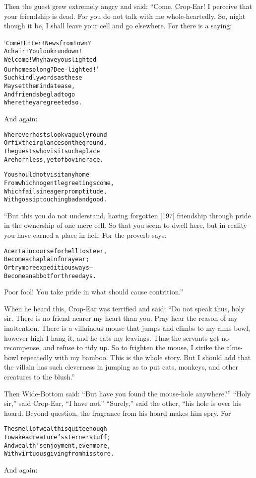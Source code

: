 \documentclass{article}
\renewenvironment{verbatim}{\begin{alltt}\normalfont\begin{centering}}{\end{centering}\end{alltt}}
\begin{document}
Then the guest grew extremely angry and said: “Come, Crop-Ear! I
perceive that your friendship is dead. For you do not talk with me
whole-heartedly. So, night though it be, I shall leave your cell
and go elsewhere. For there is a saying:

\begin{verbatim}
‘Come! Enter! News from town?
A chair! You look run down!
Welcome! Why have you slighted
Our home so long? Dee-lighted!’
Such kindly words as these
May set the mind at ease,
And friends be glad to go
Where they are greeted so.
\end{verbatim}
And again:

\begin{verbatim}
Wherever hosts look vaguely round
Or fix their glances on the ground,
The guests who visit such a place
Are hornless, yet of bovine race.

You should not visit any home
From which no gentle greetings come,
Which fails in eager promptitude,
With gossip touching bad and good.
\end{verbatim}
“But this you do not understand, having forgotten [197] friendship
through pride in the ownership of one mere cell. So that you seem
to dwell here, but in reality you have earned a place in hell. For
the proverb says:

\begin{verbatim}
A certain course for hell to steer,
Become a chaplain for a year;
Or try more expeditious ways--
Become an abbot for three days.
\end{verbatim}
Poor fool! You take pride in what should cause contrition.”

When he heard this, Crop-Ear was terrified and said:
``Do not speak thus, holy sir. There is no friend nearer my heart than you. Pray hear the reason of my inattention. There is a villainous mouse that jumps and climbs to my alms-bowl, however high I hang it, and he eats my leavings. Thus the servants get no recompense, and refuse to tidy up. So to frighten the mouse, I strike the alms-bowl repeatedly with my bamboo. This is the whole story. But I should add that the villain has such cleverness in jumping as to put cats, monkeys, and other creatures to the blush.''

Then Wide-Bottom said:
``But have you found the mouse-hole anywhere?'' ``Holy sir,'' said
Crop-Ear, ``I have not.'' ``Surely,'' said the other, “his hole is
over his hoard. Beyond question, the fragrance from his hoard makes
him spry. For

\begin{verbatim}
The smell of wealth is quite enough
To wake a creature's sterner stuff;
And wealth's enjoyment, even more,
With virtuous giving from his store.
\end{verbatim}
And again:
\end{document}
